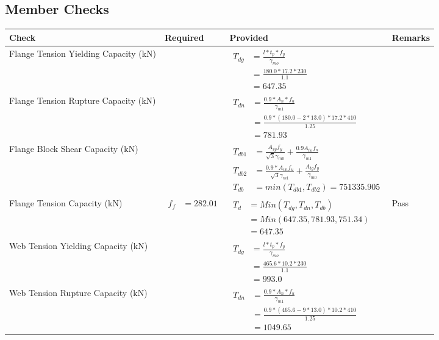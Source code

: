 \documentclass{article}%
\begin{document}
\subsection{Member Checks}%
\label{subsec:MemberChecks}%
\renewcommand{\arraystretch}{1.2}%
\begin{longtable}{|p{4cm}|p{6cm}|p{5.5cm}|p{1.5cm}|}%
\hline%
\rowcolor{OsdagGreen}%
Check&Required&Provided&Remarks\\%
\hline%
\endhead%
\hline%
Flange Tension Yielding Capacity (kN)&&$\begin{aligned} T_{dg} &= \frac{l*t_p*f_y}{\gamma_{mo}}\\ &=\frac{180.0*17.2*230}{1.1}\\ &=647.35\end{aligned}$&\\%
\hline%
Flange Tension Rupture Capacity (kN)&&$\begin{aligned} T_{dn} &= \frac{0.9*A_{n}*f_u}{\gamma_{m1}}\\ &=\frac{0.9*(180.0-2*13.0)*17.2*410}{1.25}\\ &=781.93\end{aligned}$&\\%
\hline%
Flange Block Shear Capacity (kN)&&$\begin{aligned}T_{db1} &= \frac{A_{vg} f_{y}}{\sqrt{3} \gamma_{m0}} + \frac{0.9 A_{tn} f_{u}}{\gamma_{m1}}\\ T_{db2} &= \frac{0.9*A_{vn} f_{u}}{\sqrt{3} \gamma_{m1}} + \frac{A_{tg} f_{y}}{\gamma_{m0}}\\ T_{db} &= min(T_{db1}, T_{db2})= 751335.905\end{aligned}$&\\%
\hline%
Flange Tension Capacity (kN)&$\begin{aligned} f_f &=282.01 \end{aligned}$&$\begin{aligned} T_d &= Min(T_{dg},T_{dn},T_{db})\\ &= Min(647.35,781.93,751.34)\\ &=647.35\end{aligned}$&Pass\\%
\hline%
Web Tension Yielding Capacity (kN)&&$\begin{aligned} T_{dg} &= \frac{l*t_p*f_y}{\gamma_{mo}}\\ &=\frac{465.6*10.2*230}{1.1}\\ &=993.0\end{aligned}$&\\%
\hline%
Web Tension Rupture Capacity (kN)&&$\begin{aligned} T_{dn} &= \frac{0.9*A_{n}*f_u}{\gamma_{m1}}\\ &=\frac{0.9*(465.6-9*13.0)*10.2*410}{1.25}\\ &=1049.65\end{aligned}$&\\%

\end{longtable}
\end{document}
